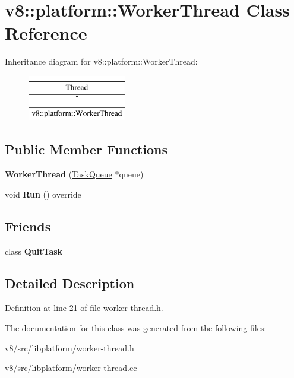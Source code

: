 \hypertarget{classv8_1_1platform_1_1WorkerThread}{}\section{v8\+:\+:platform\+:\+:Worker\+Thread Class Reference}
\label{classv8_1_1platform_1_1WorkerThread}
Inheritance diagram for v8\+:\+:platform\+:\+:Worker\+Thread\+:\begin{figure}[H]
\begin{center}
\leavevmode
\includegraphics[height=2.000000cm]{classv8_1_1platform_1_1WorkerThread}
\end{center}
\end{figure}
\subsection*{Public Member Functions}
\begin{DoxyCompactItemize}
\item 
\mbox{\label{classv8_1_1platform_1_1WorkerThread_ad39b924cb238ce05e0ff8740898dd09c}} 
{\bfseries Worker\+Thread} (\mbox{\hyperlink{classv8_1_1platform_1_1TaskQueue}{Task\+Queue}} $\ast$queue)
\item 
\mbox{\label{classv8_1_1platform_1_1WorkerThread_a229d931f339626962ce2e3e7ecdc1aa3}} 
void {\bfseries Run} () override
\end{DoxyCompactItemize}
\subsection*{Friends}
\begin{DoxyCompactItemize}
\item 
\mbox{\label{classv8_1_1platform_1_1WorkerThread_a371c4e877b93059aff86d43d63c8d70c}} 
class {\bfseries Quit\+Task}
\end{DoxyCompactItemize}


\subsection{Detailed Description}


Definition at line 21 of file worker-\/thread.\+h.



The documentation for this class was generated from the following files\+:\begin{DoxyCompactItemize}
\item 
v8/src/libplatform/worker-\/thread.\+h\item 
v8/src/libplatform/worker-\/thread.\+cc\end{DoxyCompactItemize}
